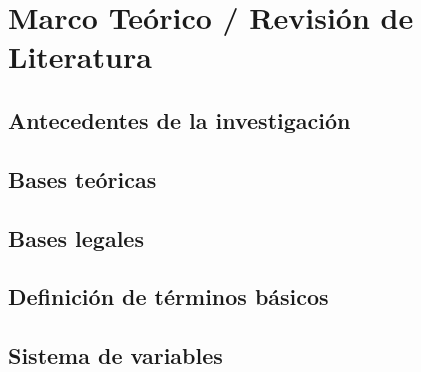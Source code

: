 \chapter{Marco Teórico / Revisión de Literatura}
\section{Antecedentes de la investigación}
\lipsum[13]
\section{Bases teóricas}
\lipsum[14]
\section{Bases legales}
\lipsum[15]
\section{Definición de términos básicos}
\lipsum[16]
\section{Sistema de variables}
\lipsum[17]
